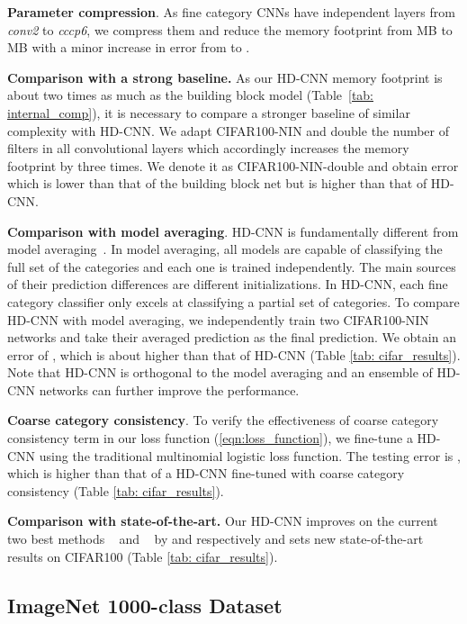 \documentclass[10pt,twocolumn,letterpaper]{article}
\begin{document}
\noindent \textbf{Parameter compression}. As fine category CNNs have independent layers from \textit{conv2} to \textit{cccp6}, we compress them and reduce the memory footprint from MB to MB with a minor increase in error from  to .

\noindent \textbf{Comparison with a strong baseline.}
As our HD-CNN memory footprint is about two times as much as the building block model (Table~\ref{tab: internal_comp}), it is necessary to compare a stronger baseline of similar complexity with HD-CNN. We adapt CIFAR100-NIN and double the number of filters in all convolutional layers which accordingly increases the memory footprint by three times. We denote it as CIFAR100-NIN-double and obtain error  which is  lower than that of the building block net but is   higher than that of HD-CNN.

\noindent \textbf{Comparison with model averaging}. HD-CNN is fundamentally different from model averaging~\cite{krizhevsky2012imagenet}. In model averaging, all models are capable of classifying the full set of the categories and each one is trained independently. The main sources of their prediction differences are different initializations. In HD-CNN, each fine category classifier only excels at classifying a partial set of categories.
To compare HD-CNN with model averaging, we independently train two CIFAR100-NIN networks and take their averaged prediction as the final prediction. We obtain an error of , which is about  higher than that of HD-CNN (Table \ref{tab: cifar_results}). 
Note that HD-CNN is orthogonal to the model averaging and an ensemble of HD-CNN networks can further improve the performance.

\noindent \textbf{Coarse category consistency}. To verify the effectiveness of coarse category consistency term in our loss function (\ref{eqn:loss_function}), we fine-tune a HD-CNN using the traditional multinomial logistic loss function. The testing error is , which is  higher than that of a HD-CNN fine-tuned with coarse category consistency (Table \ref{tab: cifar_results}). 


\noindent \textbf{Comparison with state-of-the-art.} Our HD-CNN improves on the current two best methods ~\cite{lee2014deeply} and ~\cite{stollenga2014deep} by  and  respectively and sets new state-of-the-art results on CIFAR100 (Table \ref{tab: cifar_results}).

\subsection{ImageNet 1000-class Dataset}
\label{sec:imagenet_nin}
\end{document}
